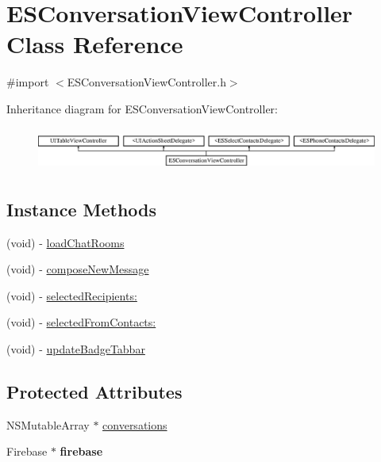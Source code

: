 \hypertarget{interface_e_s_conversation_view_controller}{}\section{E\+S\+Conversation\+View\+Controller Class Reference}
\label{interface_e_s_conversation_view_controller}


{\ttfamily \#import $<$E\+S\+Conversation\+View\+Controller.\+h$>$}

Inheritance diagram for E\+S\+Conversation\+View\+Controller\+:\begin{figure}[H]
\begin{center}
\leavevmode
\includegraphics[height=1.435897cm]{interface_e_s_conversation_view_controller}
\end{center}
\end{figure}
\subsection*{Instance Methods}
\begin{DoxyCompactItemize}
\item 
(void) -\/ \hyperlink{interface_e_s_conversation_view_controller_a7d3363f138dcf314b1d5e81aa5210660}{load\+Chat\+Rooms}
\item 
(void) -\/ \hyperlink{interface_e_s_conversation_view_controller_a58bd6b1fcee90fead41341ab1e16df09}{compose\+New\+Message}
\item 
(void) -\/ \hyperlink{interface_e_s_conversation_view_controller_ae44bb00dbc1e260b2f198eff8e2b9d4c}{selected\+Recipients\+:}
\item 
(void) -\/ \hyperlink{interface_e_s_conversation_view_controller_acba007bd1eec33c05626b06c93f5b229}{selected\+From\+Contacts\+:}
\item 
(void) -\/ \hyperlink{interface_e_s_conversation_view_controller_a399985edb3a561c881c4396dbfa70bf5}{update\+Badge\+Tabbar}
\end{DoxyCompactItemize}
\subsection*{Protected Attributes}
\begin{DoxyCompactItemize}
\item 
N\+S\+Mutable\+Array $\ast$ \hyperlink{interface_e_s_conversation_view_controller_a208ee9f8929670fa40410428ef7d0382}{conversations}
\item 
\hypertarget{interface_e_s_conversation_view_controller_ace8025d6150f30e2340c79e5ec97d34c}{}Firebase $\ast$ {\bfseries firebase}\label{interface_e_s_conversation_view_controller_ace8025d6150f30e2340c79e5ec97d34c}

\end{DoxyCompactItemize}


